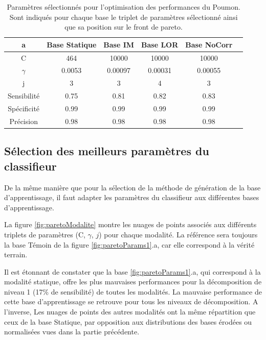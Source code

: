 \begin{table}[h!]
	\begin{center}
		\begin{tabular}{c| c c c c c}
  \hline
  a	& Base Statique	& Base IM	& Base LOR	& Base NoCorr	\\
  \hline
 C 	& 464		& 10000		& 10000		& 10000		\\
\hline
$\gamma$& 0.0053	& 0.00097	& 0.00031	& 0.00055	\\
\hline
j	& 3		& 3		& 4		& 3		\\
\hline
\hline
Sensibilité& 0.75	& 0.81		& 0.82		& 0.83	\\
\hline
Spécificité& 0.99	& 0.99		& 0.99		& 0.99		\\
\hline
Précision& 0.98		& 0.98		& 0.98		& 0.98		\\
\hline
 		\end{tabular}

	\end{center}
\caption{Paramètres sélectionnés pour l'optimisation des performances du Poumon. Sont indiqués pour chaque base le triplet de paramètres sélectionné ainsi que sa position sur le front de pareto.}
\label{fig:paramsModPoumon}
\end{table}

\subsection{Sélection des meilleurs paramètres du classifieur}

De la même manière que pour la sélection de la méthode de génération de la base d'apprentissage, il faut adapter les paramètres du classifieur aux différentes bases d'apprentissage.

La figure \ref{fig:paretoModalite} montre les nuages de points associés aux différents triplets de paramètres (C, $\gamma$, $j$) pour chaque modalité. La référence sera toujours la base Témoin de la figure \ref{fig:paretoParams1}.a, car elle correspond à la vérité terrain.

Il est étonnant de constater que la base \ref{fig:paretoParams1}.a, qui correspond à la modalité statique, offre les plus mauvaises performances pour la décomposition de niveau 1 (17\% de sensibilité) de toutes les modalités. La mauvaise performance de cette base d'apprentissage se retrouve pour tous les niveaux de décomposition. A l'inverse, Les nuages de points des autres modalités ont la même répartition que ceux de la base Statique, par opposition aux distributions des bases érodées ou normalisées vues dans la partie précédente. 

